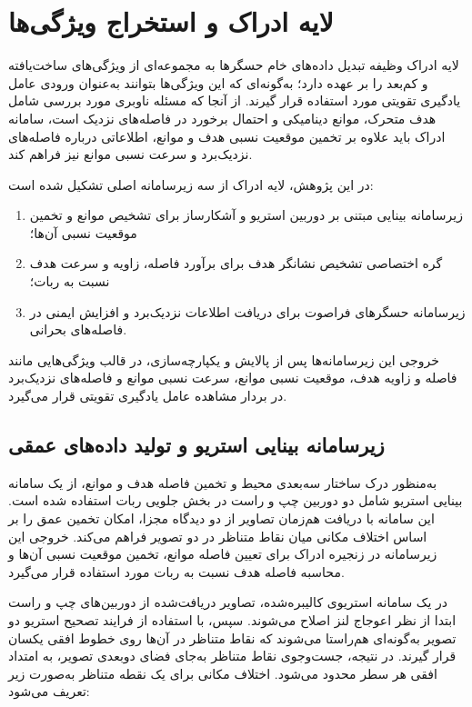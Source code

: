 \section{لایه ادراک و استخراج ویژگی‌ها}
\label{sec:perception_layer}

لایه ادراک وظیفه تبدیل داده‌های خام حسگرها به مجموعه‌ای از ویژگی‌های ساخت‌یافته و کم‌بعد را بر عهده دارد؛ به‌گونه‌ای که این ویژگی‌ها بتوانند به‌عنوان ورودی عامل یادگیری تقویتی مورد استفاده قرار گیرند. از آنجا که مسئله ناوبری مورد بررسی شامل هدف متحرک، موانع دینامیکی و احتمال برخورد در فاصله‌های نزدیک است، سامانه ادراک باید علاوه بر تخمین موقعیت نسبی هدف و موانع، اطلاعاتی درباره فاصله‌های نزدیک‌برد و سرعت نسبی موانع نیز فراهم کند.

در این پژوهش، لایه ادراک از سه زیرسامانه اصلی تشکیل شده است:
\begin{enumerate}
	\item زیرسامانه بینایی مبتنی بر دوربین استریو و آشکارساز  برای تشخیص موانع و تخمین موقعیت نسبی آن‌ها؛
	\item گره اختصاصی تشخیص نشانگر هدف برای برآورد فاصله، زاویه و سرعت هدف نسبت به ربات؛
	\item زیرسامانه حسگرهای فراصوت برای دریافت اطلاعات نزدیک‌برد و افزایش ایمنی در فاصله‌های بحرانی.
\end{enumerate}

خروجی این زیرسامانه‌ها پس از پالایش و یکپارچه‌سازی، در قالب ویژگی‌هایی مانند فاصله و زاویه هدف، موقعیت نسبی موانع، سرعت نسبی موانع و فاصله‌های نزدیک‌برد در بردار مشاهده عامل یادگیری تقویتی قرار می‌گیرد.

\subsection{زیرسامانه بینایی استریو و تولید داده‌های عمقی}
\label{subsec:stereo_depth}

به‌منظور درک ساختار سه‌بعدی محیط و تخمین فاصله هدف و موانع، از یک
سامانه بینایی استریو شامل دو دوربین چپ و راست در بخش جلویی ربات
استفاده شده است. این سامانه با دریافت هم‌زمان تصاویر از دو دیدگاه
مجزا، امکان تخمین عمق را بر اساس اختلاف مکانی%
میان نقاط متناظر در دو تصویر فراهم می‌کند. خروجی این زیرسامانه در
زنجیره ادراک برای تعیین فاصله موانع، تخمین موقعیت نسبی آن‌ها و
محاسبه فاصله هدف نسبت به ربات مورد استفاده قرار می‌گیرد.

در یک سامانه استریوی کالیبره‌شده، تصاویر دریافت‌شده از دوربین‌های
چپ و راست ابتدا از نظر اعوجاج لنز اصلاح می‌شوند. سپس، با استفاده از
فرایند تصحیح استریو%
دو تصویر به‌گونه‌ای هم‌راستا می‌شوند که نقاط متناظر در آن‌ها روی
خطوط افقی یکسان قرار گیرند. در نتیجه، جست‌وجوی نقاط متناظر به‌جای
فضای دوبعدی تصویر، به امتداد افقی هر سطر محدود می‌شود. اختلاف مکانی
برای یک نقطه متناظر به‌صورت زیر تعریف می‌شود:

